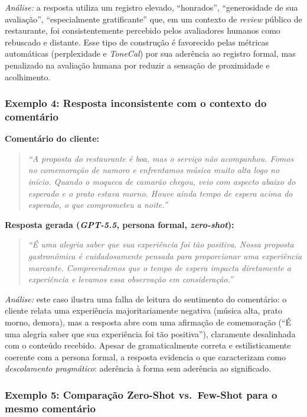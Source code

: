 \documentclass[12pt, a4paper]{article}
\numberwithin{equation}{section}
\begin{document}
 \noindent\textit{Análise:} a resposta utiliza um registro elevado, ``honrados'', 
``generosidade de sua avaliação'', ``especialmente gratificante'' que, em um contexto de 
\textit{review} público de restaurante, foi consistentemente percebido pelos avaliadores humanos como rebuscado e distante. Esse tipo de construção é favorecido pelas métricas automáticas (perplexidade e \textit{ToneCal}) por sua aderência ao registro formal, mas penalizado na avaliação humana por reduzir a sensação de proximidade e acolhimento.
 
 \subsubsection*{Exemplo 4: Resposta inconsistente com o contexto do comentário}
 
 \noindent\textbf{Comentário do cliente:}
 \begin{quote}
 \textit{``A proposta do restaurante é boa, mas o serviço não acompanhou. Fomos no comemoração de namoro e enfrentamos música muito alta logo no início. Quando o moqueca de camarão chegou, veio com aspecto abaixo do esperado e o prato estava morno. Houve ainda tempo de espera acima do esperado, o que comprometeu a noite.''}
 \end{quote}
 
 \noindent\textbf{Resposta gerada (\textit{GPT-5.5}, persona formal, \textit{zero-shot}):}
 \begin{quote}
 \textit{``É uma alegria saber que sua experiência foi tão positiva. Nossa proposta gastronômica é cuidadosamente pensada para proporcionar uma experiência marcante. Compreendemos que o tempo de espera impacta diretamente a experiência e levamos essa observação em consideração.''}
 \end{quote}
 
 \noindent\textit{Análise:} este caso ilustra uma falha de leitura do sentimento do comentário: o cliente relata uma experiência majoritariamente negativa (música alta, prato morno, demora), mas a resposta abre com uma afirmação de comemoração (``É uma alegria saber que sua experiência foi tão positiva''), claramente desalinhada com o conteúdo recebido. Apesar de gramaticalmente correta e estilisticamente coerente com a persona formal, a resposta evidencia o que  caracterizam como \textit{descolamento pragmático}: aderência à forma sem aderência ao significado.
 
 \subsubsection*{Exemplo 5: Comparação Zero-Shot vs.\ Few-Shot para o mesmo comentário}
 
\end{document}
